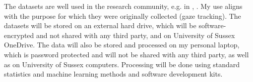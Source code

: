 \documentclass[twocolumn]{report}
\begin{document}
The datasets are well used in the research community, e.g. in \cite{Valliappan2020accelerating}, \cite{seonwook2019fewshot} . My use aligns with the purpose for which they were originally collected (gaze tracking). The datasets will be stored on an external hard drive, which will be software-encrypted and not shared with any third party, and on University of Sussex OneDrive. The data will also be stored and processed on my personal laptop, which is password protected and will not be shared with any third party, as well as on University of Sussex computers. Processing will be done using standard statistics and machine learning methods and software development kits.


\printbibliography
\end{document}
